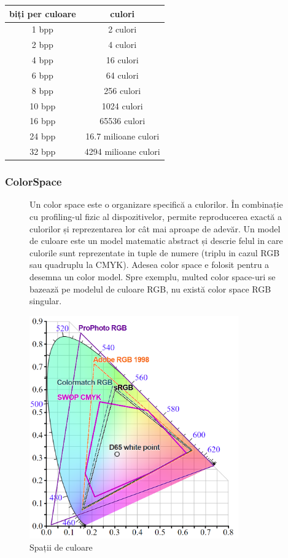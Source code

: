 \documentclass[a4paper, 12pt, twoside]{report}
\begin{document}
\begin{center}
\begin{tabular}{| c | c |}
\hline
biți per culoare & culori \\
\hline
1 bpp & 2 culori \\
2 bpp & 4 culori \\
4 bpp & 16 culori \\
6 bpp & 64 culori \\
8 bpp & 256 culori \\
10 bpp & 1024 culori \\
16 bpp & 65536 culori \\
24 bpp & 16.7 milioane culori \\
32 bpp & 4294 milioane culori \\
\hline
\end{tabular}
\end{center}

	\subsubsection{ColorSpace}


 \begin{figure}[h]
 \centering
\begin{minipage}{0.3\textwidth}\raggedright
Un color space este o organizare specifică a culorilor. În combinație cu profiling-ul fizic al dispozitivelor, permite reproducerea exactă a culorilor și reprezentarea lor cât mai aproape de adevăr. Un model de culoare este un model matematic abstract și descrie felul in care culorile sunt reprezentate in tuple de numere (triplu in cazul RGB sau quadruplu la CMYK). Adesea color space e folosit pentru a desemna un color model. Spre exemplu, multed color space-uri se bazează pe modelul de culoare RGB, nu există color space RGB singular.
\end{minipage}
 \begin{minipage}[c]{0.6\textwidth}
 \centering
        \includegraphics[width=90mm]{colorspaces.png}
        \caption{Spații de culoare}
 \end{minipage}
 \end{figure}
\end{document}
